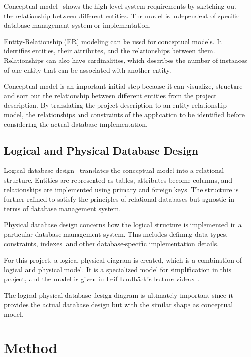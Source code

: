 \documentclass[a4paper]{scrartcl}
\renewcommand{\_}{\textunderscore\allowbreak}
\begin{document}
Conceptual model~\cite{conceptuallecture} shows the high-level system requirements by sketching out the relationship between different entities. The model is independent of specific database management system or implementation. 

Entity-Relationship (ER) modeling can be used for conceptual models. It identifies entities, their attributes, and the relationships between them. Relationships can also have cardinalities, which describes the number of instances of one entity that can be associated with another entity.

Conceptual model is an important initial step because it can visualize, structure and sort out the relationship between different entities from the project description. By translating the project description to an entity-relationship model, the relationships and constraints of the application to be identified before considering the actual database implementation.

\subsection{Logical and Physical Database Design}

Logical database design~\cite{logicallecture} translates the conceptual model into a relational structure. Entities are represented as tables, attributes become columns, and relationships are implemented using primary and foreign keys. The structure is further refined to satisfy the principles of relational databases but agnostic in terms of database management system.

Physical database design concerns how the logical structure is implemented in a particular database management system. This includes defining data types, constraints, indexes, and other database-specific implementation details.

For this project, a logical-physical diagram is created, which is a combination of logical and physical model. It is a specialized model for simplification in this project, and the model is given in Leif Lindbäck's lecture videos~\cite{logicallecture}.

The logical-physical database design diagram is ultimately important since it provides the actual database design but with the similar shape as conceptual model.

\section{Method}
\end{document}

